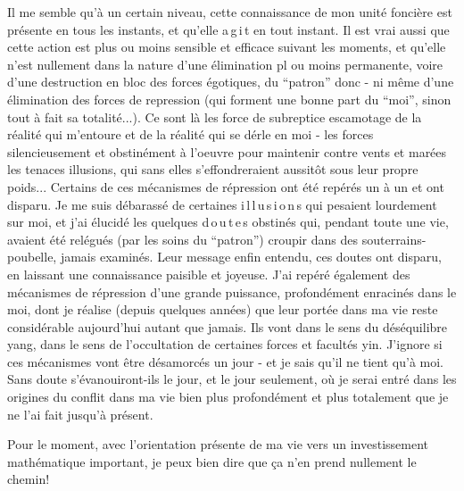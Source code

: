 Il me semble qu'à un certain niveau, cette connaissance de mon unité foncière est présente en tous les instants, et qu'elle a\,g\,i\,t en tout instant. Il est vrai aussi que cette action est plus ou moins sensible et efficace suivant les moments, et qu'elle n'est nullement dans la nature d'une élimination pl ou moins permanente, voire d'une destruction en bloc des forces égotiques, du ``patron'' donc - ni même d'une élimination des forces de repression (qui forment une bonne part du ``moi'', sinon tout à fait sa totalité...). Ce sont là les force de subreptice escamotage de la réalité qui m'entoure et de la réalité qui se dérle en moi - les forces silencieusement et obstinément à l'oeuvre pour maintenir contre vents et marées les tenaces illusions, qui sans elles s'effondreraient aussitôt sous leur propre poids... Certains de ces mécanismes de répression ont été repérés un à un et ont disparu. Je me suis débarassé de certaines i\,l\,l\,u\,s\,i\,o\,n\,s qui pesaient lourdement sur moi, et j'ai élucidé les quelques d\,o\,u\,t\,e\,s obstinés qui, pendant toute une vie, avaient été relégués (par les soins du ``patron'') croupir dans des souterrains-poubelle, jamais examinés. Leur message enfin entendu, ces doutes ont disparu, en laissant une connaissance paisible et joyeuse. J'ai repéré également des mécanismes de répression d'une grande puissance, profondément enracinés dans le moi, dont je réalise (depuis quelques années) que leur portée dans ma vie reste considérable aujourd'hui autant que jamais. Ils vont dans le sens du déséquilibre yang, dans le sens de l'occultation de certaines forces et facultés yin. J'ignore si ces mécanismes vont être désamorcés un jour - et je sais qu'il ne tient qu'à moi. Sans doute s'évanouiront-ils le jour, et le jour seulement, où je serai entré dans les origines du conflit \unsure{:|{}} dans ma vie bien plus profondément et plus totalement que je ne l'ai fait jusqu'à présent.

Pour le moment, avec l'orientation présente de ma vie vers un investissement mathématique important, je peux bien dire que ça n'en prend nullement le chemin!

